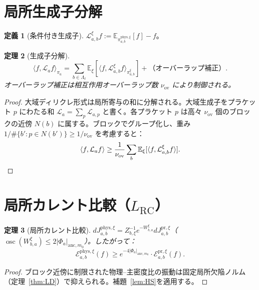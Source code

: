 \documentclass[12pt]{article}
\theoremstyle{plain}
\newtheorem{theorem}{定理}[section]
\theoremstyle{definition}
\newtheorem{definition}[theorem]{定義}
\numberwithin{equation}{section}
\newcommand{\osc}{\operatorname{osc}}
\newcommand{\pr}{\mathrm{pr}}
\newcommand{\phys}{\mathrm{phys}}
\newcommand{\ov}{\mathrm{ov}}
\begin{document}
\section{局所生成子分解}\label{sec:localgen}

\begin{definition}[条件付き生成子]
$\mathcal{L}_{a,b}^\xi f:=\mathbb{E}_{\pi_{a,b}^{\phys,\xi}}[f]-f$。
\end{definition}

\begin{theorem}[生成子分解]\label{thm:gendecomp}
\begin{equation}
\langle f,\mathcal{L}_a f\rangle_{\pi_a} = \sum_{b\in\Lambda_\ell}\mathbb{E}_\xi[\langle f,\mathcal{L}_{a,b}^\xi f\rangle_{\pi_{a,b}^\xi}]+\text{（オーバーラップ補正）}.
\end{equation}
オーバーラップ補正は相互作用オーバーラップ数 $\nu_{\ov}$ により制御される。
\end{theorem}

\begin{proof}
大域ディリクレ形式は局所寄与の和に分解される。大域生成子をプラケット $p$ にわたる和 $\mathcal{L}_a=\sum_p\mathcal{L}_{a,p}$ と書く。各プラケット $p$ は高々 $\nu_{\ov}$ 個のブロックの近傍 $N(b)$ に属する。ブロックでグループ化し、重み $1/\#\{b':p\in N(b')\}\geq 1/\nu_{\ov}$ を考慮すると：
\begin{equation}
\langle f,\mathcal{L}_a f\rangle \geq \frac{1}{\nu_{\ov}}\sum_b\mathbb{E}_\xi[\langle f,\mathcal{L}_{a,b}^\xi f\rangle].\qedhere
\end{equation}
\end{proof}


\section{局所カレント比較（$L_{\mathrm{RC}}$）}\label{sec:LRC}

\begin{theorem}[局所カレント比較]\label{thm:LRC}
$dJ_{a,b}^{\phys,\xi}=Z_{b,\xi}^{-1}e^{-W_{b,a}^\xi}dJ_{a,b}^{\pr,\xi}$（$\osc(W_{b,a}^\xi)\leq 2|\Phi_a|_{\mathrm{anc},m_0}$）。したがって：
\begin{equation}
\mathcal{E}_{a,b}^{\phys,\xi}(f) \geq e^{-4|\Phi_a|_{\mathrm{anc},m_0}}\cdot\mathcal{E}_{a,b}^{\pr,\xi}(f).
\end{equation}
\end{theorem}

\begin{proof}
ブロック近傍に制限された物理--主密度比の振動は固定局所欠陥ノルム（定理~\ref{thm:LD}）で抑えられる。補題~\ref{lem:HS}を適用する。
\end{proof}
\end{document}

